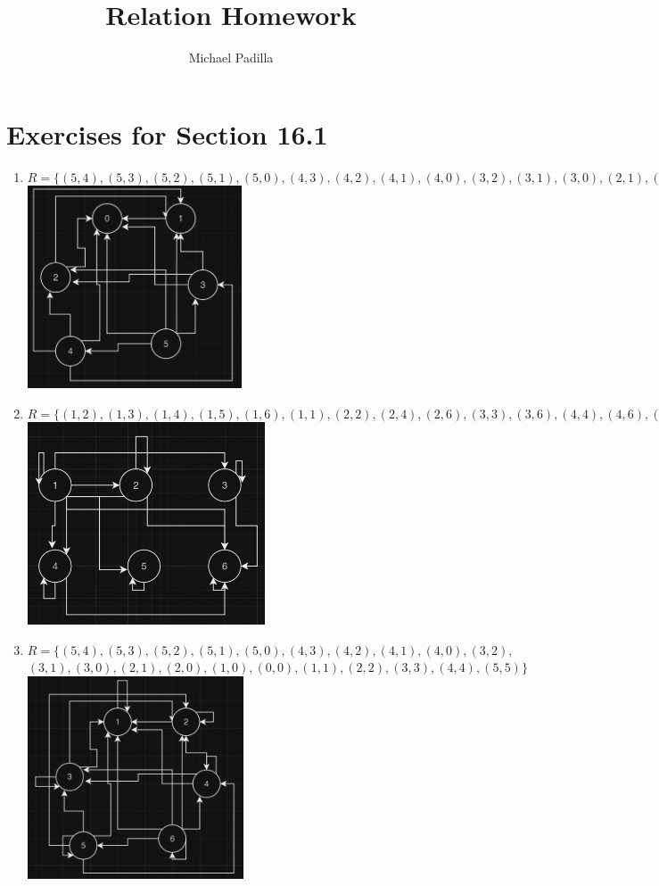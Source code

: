 \documentclass[12pt]{article}
\title{Relation Homework}
\author{Michael Padilla}
\begin{document}
 
\maketitle
\section*{Exercises for Section 16.1}
\begin{enumerate}
    \item $R = \{(5,4),(5,3),(5,2),(5,1),(5,0),(4,3),(4,2),(4,1),(4,0),(3,2),(3,1),(3,0),(2,1),(2,0),(1,0)\}$\\
	\includegraphics*[height=6cm]{1}
    \item $R =\{(1,2),(1,3),(1,4),(1,5),(1,6),(1,1),(2,2),(2,4),(2,6),(3,3),(3,6),(4,4),(4,6),(5,5),(6,6)\}$\\
	\includegraphics*[height=6cm]{2}
    \item $R = \{(5,4),(5,3),(5,2),(5,1),(5,0),(4,3),(4,2),(4,1),(4,0),(3,2),$\\
	$(3,1),(3,0),(2,1),(2,0),(1,0), (0,0), (1,1), (2,2), (3,3),(4,4), (5,5)\}$\\
	\includegraphics*[height=6cm]{3}

\end{enumerate}
\end{document}

